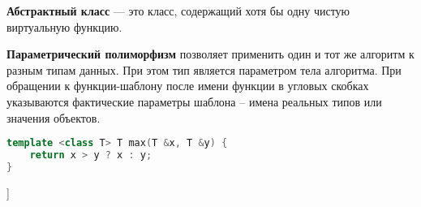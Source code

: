\textbf{Абстрактный класс} --- это класс, содержащий хотя бы одну чистую виртуальную функцию.

\textbf{Параметрический полиморфизм} позволяет применить один и тот же алгоритм к разным типам данных. При этом тип является параметром тела алгоритма. При обращении к функции-шаблону после имени функции в угловых скобках указываются фактические параметры шаблона -- имена реальных типов или значения объектов.
\begin{lstlisting}[language=C++]
template <class T> T max(T &x, T &y) {
    return x > y ? x : y; 
}
\end{lstlisting}

\bigbreak
[\cite[page 20-23]{gerbert}]
